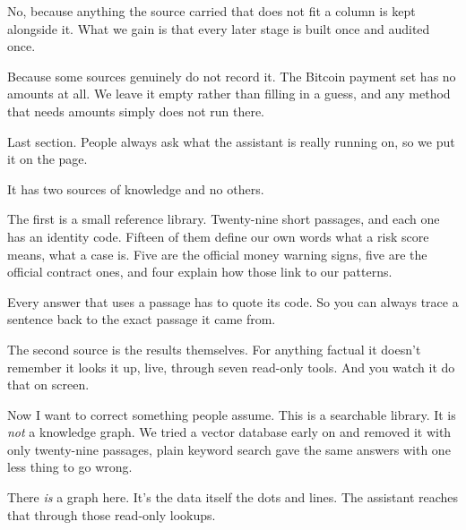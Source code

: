 \documentclass[11pt]{article}
\begin{document}
\begin{asked}
 No, because
anything the source carried that does not fit a column is kept alongside it. What
we gain is that every later stage is built once and audited once.

 Because some sources genuinely do not record
it. The Bitcoin payment set has no amounts at all. We leave it empty rather than
filling in a guess, and any method that needs amounts simply does not run there.
\end{asked}


\begin{saythis}
Last section. People always ask what the assistant is really running on, so we
put it on the page.

It has two sources of knowledge and no others.

The first is a small reference library. Twenty-nine short passages, and each one
has an identity code. Fifteen of them define our own words \bt what a risk score
means, what a case is. Five are the official money warning signs, five are the
official contract ones, and four explain how those link to our patterns.

Every answer that uses a passage has to quote its code. So you can always trace
a sentence back to the exact passage it came from.

The second source is the results themselves. For anything factual it doesn't
remember \bt it looks it up, live, through seven read-only tools. And you watch
it do that on screen.

Now I want to correct something people assume. This is a searchable library.
It is \emph{not} a knowledge graph. We tried a vector database early on and
removed it \bt with only twenty-nine passages, plain keyword search gave the
same answers with one less thing to go wrong.

There \emph{is} a graph here. It's the data itself \bt the dots and lines. The
assistant reaches that through those read-only lookups.
\end{saythis}
\end{document}
